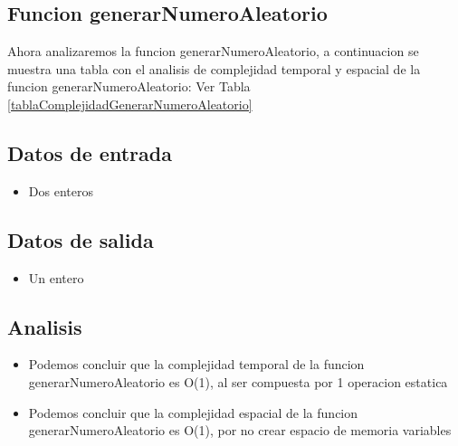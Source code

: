 \documentclass[10pt,twocolumn]{article}
\begin{document}








\subsection{Funcion generarNumeroAleatorio}

Ahora analizaremos la funcion generarNumeroAleatorio, a continuacion se muestra una tabla con el analisis de complejidad temporal y espacial de la funcion generarNumeroAleatorio:
Ver Tabla \ref{tablaComplejidadGenerarNumeroAleatorio}

\subsection{Datos de entrada}
\begin{itemize}
\item Dos enteros
\end{itemize}

\subsection{Datos de salida}
\begin{itemize}
\item Un entero
\end{itemize}

\subsection{Analisis}
\begin{itemize}
\item Podemos concluir que la complejidad temporal de la funcion generarNumeroAleatorio es O(1), al ser compuesta por 1 operacion estatica
\item Podemos concluir que la complejidad espacial de la funcion generarNumeroAleatorio es O(1), por no crear espacio de memoria variables
\end{itemize}
\end{document}
